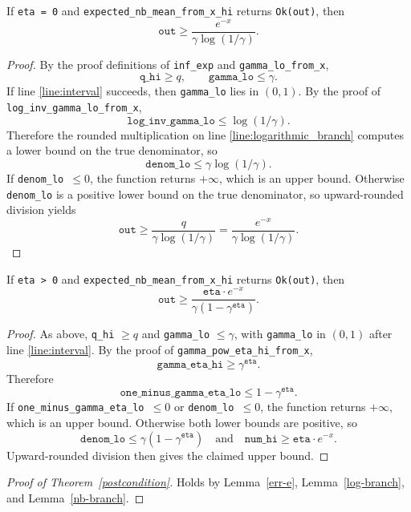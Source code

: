 \documentclass{article}
\begin{document}
\begin{lemma}
\label{log-branch}
If \texttt{eta = 0} and \texttt{expected\_nb\_mean\_from\_x\_hi} returns \texttt{Ok(out)}, then
\[
\texttt{out} \ge \frac{e^{-x}}{\gamma \log(1/\gamma)}.
\]
\end{lemma}

\begin{proof}
By the proof definitions of \texttt{inf\_exp} and \texttt{gamma\_lo\_from\_x},
\[
\texttt{q\_hi} \ge q, \qquad \texttt{gamma\_lo} \le \gamma.
\]
If line \ref{line:interval} succeeds, then \texttt{gamma\_lo} lies in $(0,1)$.
By the proof of \texttt{log\_inv\_gamma\_lo\_from\_x},
\[
\texttt{log\_inv\_gamma\_lo} \le \log(1/\gamma).
\]
Therefore the rounded multiplication on line \ref{line:logarithmic_branch} computes a lower bound
on the true denominator, so
\[
\texttt{denom\_lo} \le \gamma \log(1/\gamma).
\]
If \texttt{denom\_lo $\le 0$}, the function returns $+\infty$, which is an upper bound.
Otherwise \texttt{denom\_lo} is a positive lower bound on the true denominator, so upward-rounded
division yields
\[
\texttt{out} \ge \frac{q}{\gamma \log(1/\gamma)} = \frac{e^{-x}}{\gamma \log(1/\gamma)}.
\]
\end{proof}

\begin{lemma}
\label{nb-branch}
If \texttt{eta > 0} and \texttt{expected\_nb\_mean\_from\_x\_hi} returns \texttt{Ok(out)}, then
\[
\texttt{out} \ge \frac{\texttt{eta} \cdot e^{-x}}{\gamma(1 - \gamma^{\texttt{eta}})}.
\]
\end{lemma}

\begin{proof}
As above, \texttt{q\_hi} $\ge q$ and \texttt{gamma\_lo} $\le \gamma$, with \texttt{gamma\_lo} in
$(0,1)$ after line \ref{line:interval}.
By the proof of \texttt{gamma\_pow\_eta\_hi\_from\_x},
\[
\texttt{gamma\_eta\_hi} \ge \gamma^{\texttt{eta}}.
\]
Therefore
\[
\texttt{one\_minus\_gamma\_eta\_lo} \le 1 - \gamma^{\texttt{eta}}.
\]
If \texttt{one\_minus\_gamma\_eta\_lo $\le 0$} or \texttt{denom\_lo $\le 0$}, the function returns
$+\infty$, which is an upper bound.
Otherwise both lower bounds are positive, so
\[
\texttt{denom\_lo} \le \gamma(1 - \gamma^{\texttt{eta}})
\quad\text{and}\quad
\texttt{num\_hi} \ge \texttt{eta} \cdot e^{-x}.
\]
Upward-rounded division then gives the claimed upper bound.
\end{proof}

\begin{proof}[Proof of Theorem~\ref{postcondition}]
Holds by Lemma~\ref{err-e}, Lemma~\ref{log-branch}, and Lemma~\ref{nb-branch}.
\end{proof}
\end{document}
